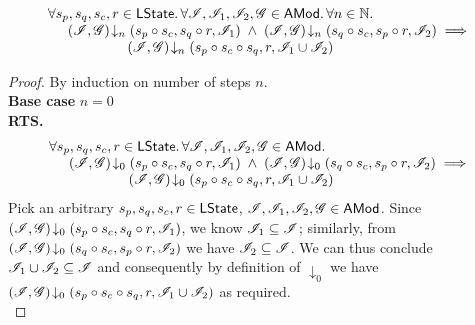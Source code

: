 \begin{lemma}\label{lem:merge-closure}
%
\[
\begin{array}{l}
	\forall s_p, s_q, s_c, r \in \textsf{LState}.\, \forall \mathscr{I}, \mathscr{I}_{1}, \mathscr{I}_{2}, \mathscr{G} \in \textsf{AMod}.\, \forall n \in \mathbb{N}.\,\\
	\hspace*{0.5cm} \left(\mathscr{I}, \mathscr{G}\right) \!\downarrow_{n} \left(s_p \circ s_c, s_q \circ r, \mathscr{I}_{1}\right) \;\land\; \left(\mathscr{I}, \mathscr{G}\right) \!\downarrow_{n} \left(s_q \circ s_c, s_p \circ r, \mathscr{I}_{2}\right)
	\implies\\
	\hspace*{2cm} \left(\mathscr{I}, \mathscr{G}\right) \!\downarrow_{n} \left(s_p \circ s_c \circ s_q, r, \mathscr{I}_{1} \cup \mathscr{I}_{2}\right)
\end{array}
\]
%
\begin{proof} By induction on number of steps $n$.\\
\noindent\textbf{Base case} $n = 0$\\
\textbf{RTS. }
%
\[
\begin{array}{l}
	\forall s_p, s_q, s_c, r \in \textsf{LState}.\, \forall \mathscr{I}, \mathscr{I}_{1}, \mathscr{I}_{2}, \mathscr{G} \in \textsf{AMod}.\, \\
	\hspace*{0.5cm} \left(\mathscr{I}, \mathscr{G}\right) \!\downarrow_{0} \left(s_p \circ s_c, s_q \circ r, \mathscr{I}_{1}\right) \;\land\; \left(\mathscr{I}, \mathscr{G}\right) \!\downarrow_{0} \left(s_q \circ s_c, s_p \circ r, \mathscr{I}_{2}\right)
	\implies\\
	\hspace*{2cm} \left(\mathscr{I}, \mathscr{G}\right) \!\downarrow_{0} \left(s_p \circ s_c \circ s_q, r, \mathscr{I}_{1} \cup \mathscr{I}_{2}\right)
\end{array}
\]
%
Pick an arbitrary $s_p, s_q, s_c, r \in \textsf{LState}$, $\mathscr{I}, \mathscr{I}_{1}, \mathscr{I}_{2}, \mathscr{G} \in \textsf{AMod}$. Since $ \left(\mathscr{I}, \mathscr{G}\right) \!\downarrow_{0} \left(s_p \circ s_c, s_q \circ r, \mathscr{I}_{1}\right)$, we know $\mathscr{I}_{1} \subseteq \mathscr{I}$; similarly, from $\left(\mathscr{I}, \mathscr{G}\right) \!\downarrow_{0} \left(s_q \circ s_c, s_p \circ r, \mathscr{I}_{2}\right)$ we have $\mathscr{I}_{2} \subseteq \mathscr{I}$. We can thus conclude $\mathscr{I}_{1} \cup \mathscr{I}_{2} \subseteq \mathscr{I}$ and consequently by definition of $\downarrow_0$ we have $\left(\mathscr{I}, \mathscr{G}\right) \!\downarrow_{0} \left(s_p \circ s_c \circ s_q, r, \mathscr{I}_{1} \cup \mathscr{I}_{2}\right)$ as required.\\


\end{proof}
\end{lemma}
